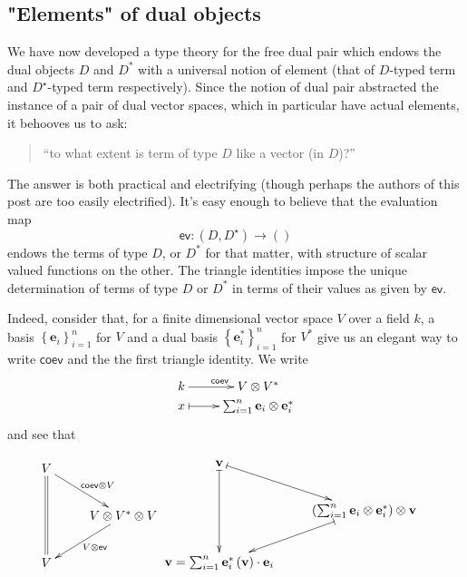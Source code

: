 \documentclass[pra,floatfix,
amsmath,superscriptaddress, 12pt]{article}
\theoremstyle{definition}
\newcommand{\evmap}{\mathsf{ev}}
\newcommand{\coev}{\mathsf{coev}}
\begin{document}
\subsection{"Elements" of dual objects}
We have now developed a type theory for the free dual pair which endows
the dual objects $D$ and $D^{*}$ with a universal notion of element (that of $D$-typed term and $D^\star$-typed term respectively).
Since the notion of dual pair abstracted the instance of a pair of
dual vector spaces, which in particular have actual elements, it behooves
us to ask:
\begin{quotation}
``to what extent is term of type $D$ like a vector (in $D$)?''
\end{quotation}
The answer is both practical and electrifying (though perhaps the
authors of this post are too easily electrified).
%
It's easy enough to believe that the evaluation map 
\[
\evmap:\left(D,D^{\star}\right)\longrightarrow\left(\right)
\]
 endows the terms of type $D$, or $D^{*}$ for that matter, with
structure of scalar valued functions on the other. The triangle identities impose the unique determination of terms of type $D$ or $D^*$ in terms of their values as given by $\evmap$.

\par

Indeed, consider that, for a finite dimensional vector space $V$ over a field
$k$, a basis $\left\{ \mathbf{e}_{i}\right\} _{i=1}^{n}$ for $V$
and a dual basis $\left\{ \mathbf{e}_{i}^{*}\right\} _{i=1}^{n}$
for $V^{*}$ give us an elegant way to write $\coev$ and the the
first triangle identity. We write
\[
\xymatrixrowsep{0pc}\xymatrix{k\ar[r]^{\coev} & V\otimes V^{*}\\
x\ar@{|->}[r] & \sum_{i=1}^{n}\mathbf{e}_{i}\otimes\mathbf{e}_{i}^{*}
}
\]
and see that

\begin{align*}
    \vcenter{\vbox{\xymatrix{
        V
        \ar@{=}[dd]
        \ar[dr]^{\coev\otimes V}
            \\
            &
            V\otimes V^{*}\otimes V
            \ar[dl]^{V\otimes\evmap}
                \\
        V
    }}}
        &
        \vcenter{\vbox{\xymatrix{
            \mathbf{v}
            \ar@{|->}[dd]
            \ar@{|->}[dr]
                \\
                &
                \left(\sum_{i=1}^{n}\mathbf{e}_{i}\otimes\mathbf{e}_{i}^{*}\right)\otimes\mathbf{v}
                \ar@{|->}[dl]
                    \\
            \mathbf{v}=\sum_{i=1}^{n}\mathbf{e}_{i}^{*}\left(\mathbf{v}\right)\cdot\mathbf{e}_{i}
    }}}
\end{align*}
\end{document}
